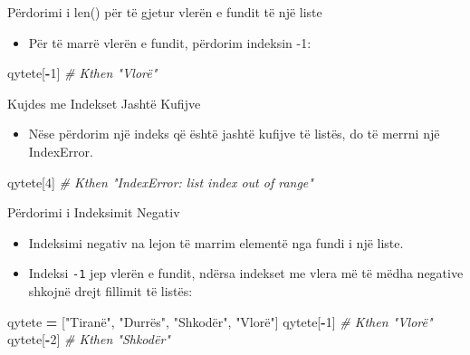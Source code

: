 \documentclass[
  ignorenonframetext,
]{beamer}
\newenvironment{Shaded}{\begin{snugshade}}{\end{snugshade}}
\newcommand{\CommentTok}[1]{\textcolor[rgb]{0.56,0.35,0.01}{\textit{#1}}}
\newcommand{\DecValTok}[1]{\textcolor[rgb]{0.00,0.00,0.81}{#1}}
\newcommand{\NormalTok}[1]{#1}
\newcommand{\OperatorTok}[1]{\textcolor[rgb]{0.81,0.36,0.00}{\textbf{#1}}}
\newcommand{\StringTok}[1]{\textcolor[rgb]{0.31,0.60,0.02}{#1}}
\providecommand{\tightlist}{%
  \setlength{\itemsep}{0pt}\setlength{\parskip}{0pt}}
\begin{document}
\begin{frame}[fragile]{Përdorimi i len() për të gjetur vlerën e fundit
të një liste}
\protect\hypertarget{puxebrdorimi-i-len-puxebr-tuxeb-gjetur-vleruxebn-e-fundit-tuxeb-njuxeb-liste-1}{}
\begin{itemize}
\tightlist
\item
  Për të marrë vlerën e fundit, përdorim indeksin -1:
\end{itemize}

\begin{Shaded}
\begin{Highlighting}[]
\NormalTok{qytete[}\OperatorTok{{-}}\DecValTok{1}\NormalTok{]  }\CommentTok{\# Kthen "Vlorë"}
\end{Highlighting}
\end{Shaded}
\end{frame}

\begin{frame}[fragile]{Kujdes me Indekset Jashtë Kufijve}
\protect\hypertarget{kujdes-me-indekset-jashtuxeb-kufijve-1}{}
\begin{itemize}
\tightlist
\item
  Nëse përdorim një indeks që është jashtë kufijve të listës, do të
  merrni një IndexError.
\end{itemize}

\begin{Shaded}
\begin{Highlighting}[]
\NormalTok{qytete[}\DecValTok{4}\NormalTok{]  }\CommentTok{\# Kthen "IndexError: list index out of range"}
\end{Highlighting}
\end{Shaded}
\end{frame}

\begin{frame}[fragile]{Përdorimi i Indeksimit Negativ}
\protect\hypertarget{puxebrdorimi-i-indeksimit-negativ}{}
\begin{itemize}
\item
  Indeksimi negativ na lejon të marrim elementë nga fundi i një liste.
\item
  Indeksi \texttt{-1} jep vlerën e fundit, ndërsa indekset me vlera më
  të mëdha negative shkojnë drejt fillimit të listës:
\end{itemize}

\begin{Shaded}
\begin{Highlighting}[]
\NormalTok{  qytete }\OperatorTok{=}\NormalTok{ [}\StringTok{"Tiranë"}\NormalTok{, }\StringTok{"Durrës"}\NormalTok{, }\StringTok{"Shkodër"}\NormalTok{, }\StringTok{"Vlorë"}\NormalTok{]}
\NormalTok{  qytete[}\OperatorTok{{-}}\DecValTok{1}\NormalTok{]  }\CommentTok{\# Kthen "Vlorë"}
\NormalTok{  qytete[}\OperatorTok{{-}}\DecValTok{2}\NormalTok{]  }\CommentTok{\# Kthen "Shkodër"}
\end{Highlighting}
\end{Shaded}
\end{frame}
\end{document}
